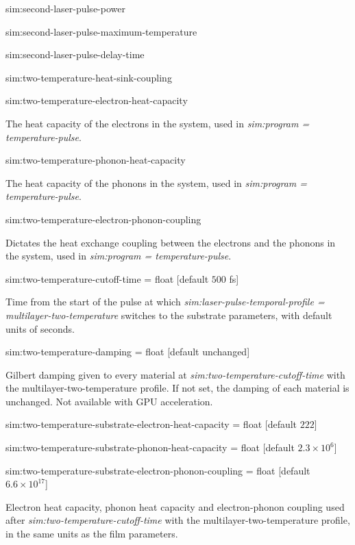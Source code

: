 {\zicf sim:second-laser-pulse-power}

{\zicf sim:second-laser-pulse-maximum-temperature}

{\zicf sim:second-laser-pulse-delay-time}

{\zicf sim:two-temperature-heat-sink-coupling}

{\zicf sim:two-temperature-electron-heat-capacity} The heat capacity of the electrons in the system, used in \textit{sim:program = temperature-pulse}.

{\zicf sim:two-temperature-phonon-heat-capacity} The heat capacity of the phonons in the system, used in \textit{sim:program = temperature-pulse}.

{\zicf sim:two-temperature-electron-phonon-coupling}
Dictates the heat exchange coupling between the electrons and the phonons in the system, used in \newline\textit{sim:program = temperature-pulse}.

{\zicf sim:two-temperature-cutoff-time = float [default $500$ fs]}
Time from the start of the pulse at which \textit{sim:laser-pulse-temporal-profile = multilayer-two-temperature}
switches to the substrate parameters, with default units of seconds.

{\zicf sim:two-temperature-damping = float [default unchanged]}
Gilbert damping given to every material at \textit{sim:two-temperature-cutoff-time} with the
multilayer-two-temperature profile. If not set, the damping of each material is unchanged. Not available
with GPU acceleration.

{\zicf sim:two-temperature-substrate-electron-heat-capacity = float [default $222$]}
{\zicf sim:two-temperature-substrate-phonon-heat-capacity = float [default $2.3\times10^{6}$]}
{\zicf sim:two-temperature-substrate-electron-phonon-coupling = float [default $6.6\times10^{17}$]}
Electron heat capacity, phonon heat capacity and electron-phonon coupling used after
\textit{sim:two-temperature-cutoff-time} with the multilayer-two-temperature profile, in the same units as
the film parameters.

